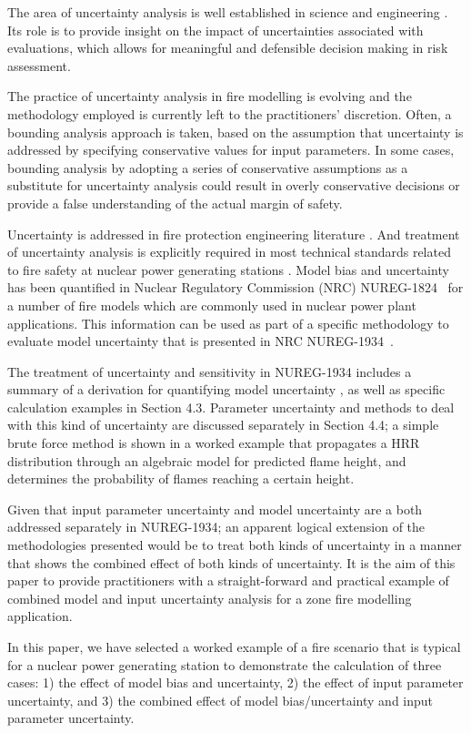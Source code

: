 
The area of uncertainty analysis is well established in science and engineering \cite{Morgan}.  Its role is to provide insight on the impact of uncertainties associated with evaluations, which allows for meaningful and defensible decision making in risk assessment.

The practice of uncertainty analysis in fire modelling is evolving and the methodology employed is currently left to the practitioners' discretion. Often, a bounding analysis approach is taken, based on the assumption that uncertainty is addressed by specifying conservative values for input parameters. In some cases, bounding analysis by adopting a series of conservative assumptions as a substitute for uncertainty analysis could result in overly conservative decisions or provide a false understanding of the actual margin of safety. 

Uncertainty is addressed in fire protection engineering literature \cite{Notarianni:SFPE}.  And treatment of uncertainty analysis is explicitly required in most technical standards related to fire safety at nuclear power generating stations \cite{NFPA:805, NUREG_6850}.  Model bias and uncertainty has been quantified in Nuclear Regulatory Commission (NRC) NUREG-1824~\cite{NUREG_1824_Sup_1} for a number of fire models which are commonly used in nuclear power plant applications. This information can be used as part of a specific methodology to evaluate model uncertainty  that is presented in NRC NUREG-1934~\cite{NUREG_1934}. 

The treatment of  uncertainty and sensitivity in NUREG-1934 includes a summary of a derivation for quantifying model uncertainty \cite{McGrattan2011a}, as well as specific calculation examples in Section 4.3. Parameter uncertainty and methods to deal with this kind of uncertainty are discussed separately in Section 4.4; a simple brute force method is shown in  a worked example that propagates a HRR distribution through an algebraic model for predicted flame height, and determines the probability of flames reaching a certain height.

Given that input parameter uncertainty and model uncertainty are a both addressed separately in NUREG-1934; an apparent logical extension of the methodologies presented would be to treat both kinds of uncertainty in a manner that shows the combined effect of both kinds of uncertainty.  It is the aim of this paper to provide practitioners with a straight-forward and practical example of combined model and input uncertainty analysis for a zone fire modelling application. 

In this paper, we have selected  a worked example of a fire scenario that is typical for a nuclear power generating station to demonstrate the calculation of three cases: 1) the effect of model bias and uncertainty, 2) the effect of input parameter uncertainty, and 3) the combined effect of model bias/uncertainty and input parameter uncertainty. 

